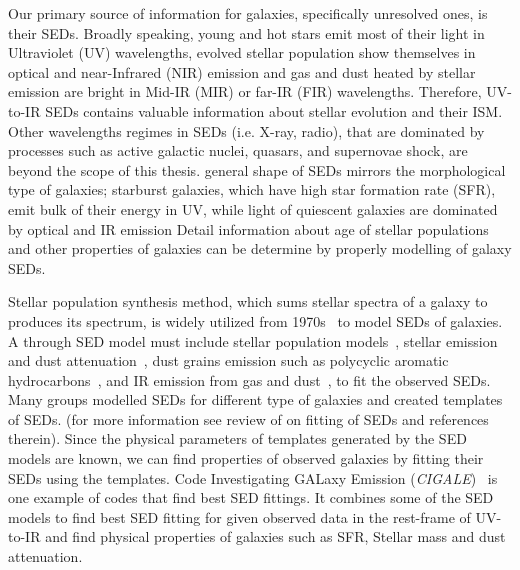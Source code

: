 Our primary source of information for galaxies, specifically unresolved ones, is their SEDs.
Broadly speaking, young and hot stars emit most of their light in Ultraviolet (UV) wavelengths, evolved stellar population show themselves in optical and near-Infrared (NIR) emission and gas and dust heated by stellar emission are bright in Mid-IR (MIR) or far-IR (FIR) wavelengths.
Therefore, UV-to-IR SEDs contains valuable information about stellar evolution and their ISM. 
Other wavelengths regimes in SEDs (i.e. X-ray, radio), that are dominated by processes such as active galactic nuclei, quasars, and supernovae shock, are beyond the scope of this thesis.
general shape of SEDs mirrors the morphological type of galaxies; starburst galaxies, which have high star formation rate (SFR), emit bulk of their energy in UV, while light of quiescent galaxies are dominated by optical and IR emission 
Detail information about age of stellar populations and other properties of galaxies can be determine by properly modelling of galaxy SEDs.

Stellar population synthesis method, which sums stellar spectra of a galaxy to produces its spectrum, is widely utilized from 1970s~\citep[e.g.][]{Tinsley72,Searle73} to model SEDs of galaxies.
A through SED model must include stellar population models~\citep[e.g.][]{Bruzual93,Bruzual03,Maraston05}, stellar emission and dust attenuation~\citep[e.g.][]{Calzetti00,Dopita05}, dust grains emission such as polycyclic aromatic hydrocarbons~\citep[PAHs; e.g.][and references therein]{Tielens08}, and IR emission from gas and dust~\citep[e.g.][]{Chary01,Dale02,Lagache03,Lagache04,Smith07a,Draine07}, to fit the observed SEDs.
Many groups modelled SEDs for different type of galaxies and created templates of SEDs. (for more information see review of \cite{Walcher11} on fitting of SEDs and references therein).
Since the physical parameters of templates generated by the SED models are known, we can find properties of observed galaxies by fitting their SEDs using the templates.
Code Investigating GALaxy Emission ({\em CIGALE})~\citep{Noll09} is one example of codes that find best SED fittings.
It combines some of the SED models to find best SED fitting for given observed data in the rest-frame of UV-to-IR and find physical properties of galaxies such as SFR, Stellar mass and dust attenuation.


